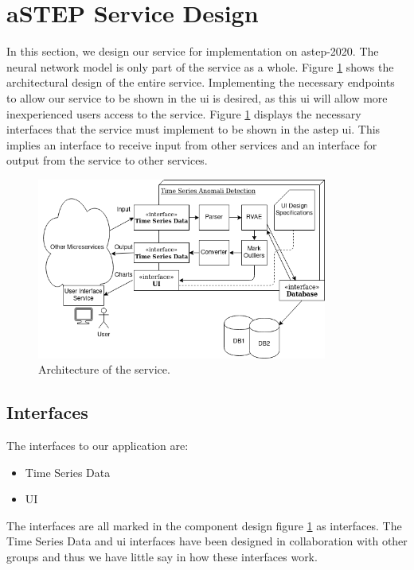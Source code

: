 \section{aSTEP Service Design}\label{sec:service_design}
In this section, we design our service for implementation on \gls{astep}-2020. The neural network model is only part of the service as a whole.
Figure \ref{fig:service-component} shows the architectural design of the entire service. Implementing the necessary \glspl{endpoint} to allow our service to be shown in the \gls{ui} is desired, as this \gls{ui} will allow more inexperienced users access to the service. Figure \ref{fig:service-component} displays the necessary interfaces that the service must implement to be shown in the \gls{astep} \gls{ui}. This implies an interface to receive input from other services and an interface for output from the service to other services.

\begin{figure}[htbp]
    \centering
    \includegraphics[width=0.85\textwidth]{Pictures/Sprint_2/ComponentArchitecture.png}
    \caption{Architecture of the service.}
    \label{fig:service-component}
\end{figure}

\subsection{Interfaces}
The interfaces to our application are:
\begin{itemize}
    \item Time Series Data
    \item UI
\end{itemize}
The interfaces are all marked in the component design figure \ref{fig:service-component} as interfaces.
The Time Series Data and \gls{ui} interfaces have been designed in collaboration with other groups and thus we have little say in how these interfaces work.

